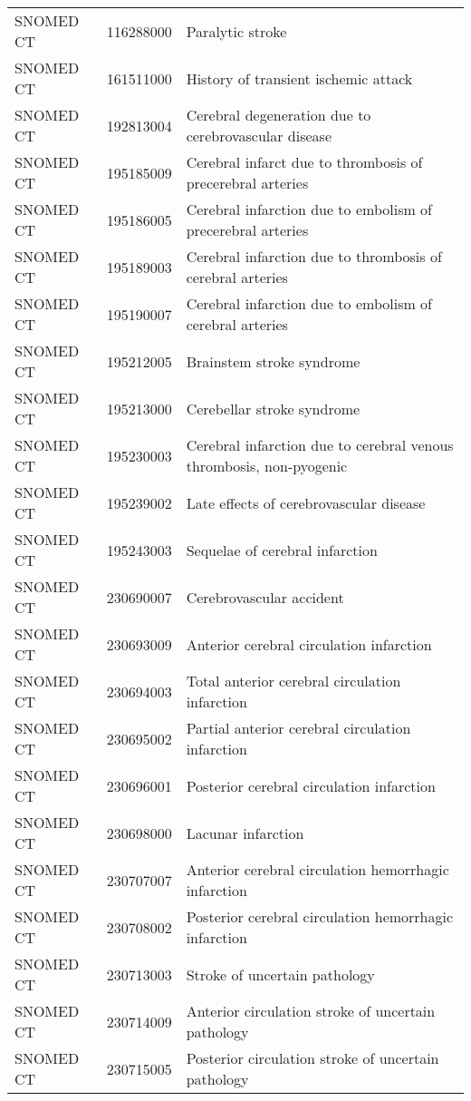 \begin{longtable}{p{}p{}p{}}
  SNOMED CT & 116288000 & Paralytic stroke \\ 
  SNOMED CT & 161511000 & History of transient ischemic attack \\ 
  SNOMED CT & 192813004 & Cerebral degeneration due to cerebrovascular disease \\ 
  SNOMED CT & 195185009 & Cerebral infarct due to thrombosis of precerebral arteries \\ 
  SNOMED CT & 195186005 & Cerebral infarction due to embolism of precerebral arteries \\ 
  SNOMED CT & 195189003 & Cerebral infarction due to thrombosis of cerebral arteries \\ 
  SNOMED CT & 195190007 & Cerebral infarction due to embolism of cerebral arteries \\ 
  SNOMED CT & 195212005 & Brainstem stroke syndrome \\ 
  SNOMED CT & 195213000 & Cerebellar stroke syndrome \\ 
  SNOMED CT & 195230003 & Cerebral infarction due to cerebral venous thrombosis, non-pyogenic \\ 
  SNOMED CT & 195239002 & Late effects of cerebrovascular disease \\ 
  SNOMED CT & 195243003 & Sequelae of cerebral infarction \\ 
  SNOMED CT & 230690007 & Cerebrovascular accident \\ 
  SNOMED CT & 230693009 & Anterior cerebral circulation infarction \\ 
  SNOMED CT & 230694003 & Total anterior cerebral circulation infarction \\ 
  SNOMED CT & 230695002 & Partial anterior cerebral circulation infarction \\ 
  SNOMED CT & 230696001 & Posterior cerebral circulation infarction \\ 
  SNOMED CT & 230698000 & Lacunar infarction \\ 
  SNOMED CT & 230707007 & Anterior cerebral circulation hemorrhagic infarction \\ 
  SNOMED CT & 230708002 & Posterior cerebral circulation hemorrhagic infarction \\ 
  SNOMED CT & 230713003 & Stroke of uncertain pathology \\ 
  SNOMED CT & 230714009 & Anterior circulation stroke of uncertain pathology \\ 
  SNOMED CT & 230715005 & Posterior circulation stroke of uncertain pathology \\ 

\end{longtable}
